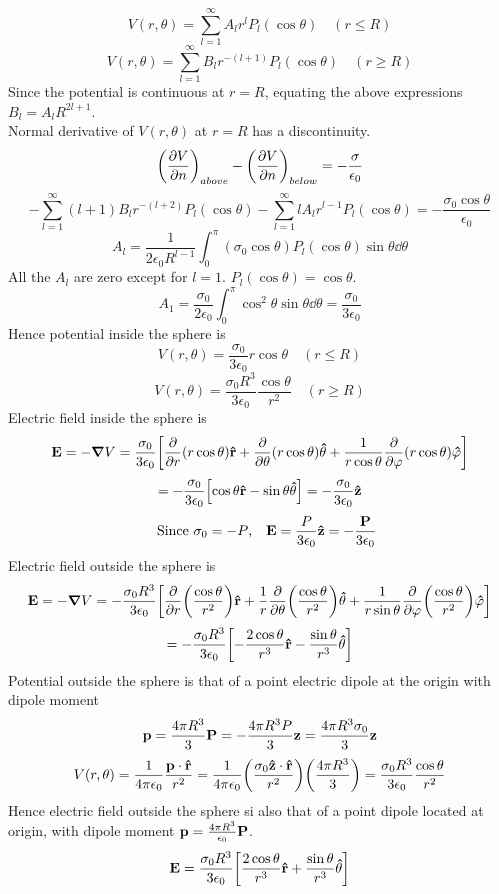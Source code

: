 \documentclass[12pt]{article}
\begin{document}
\[V(r,\theta)=\sum_{l=1}^{\infty}A_lr^lP_l(\cos\theta)\quad(r\leq R)\]
\[V(r,\theta)=\sum_{l=1}^{\infty}B_lr^{-(l+1)}P_l(\cos\theta)\quad(r\geq R)\]
Since the potential is continuous at $r=R$, equating the above expressions $B_l=A_lR^{2l+1}$.\\
Normal derivative of $V(r,\theta)$ at $r=R$ has a discontinuity.
\[\qty(\pdv{V}{n})_{above}-\qty(\pdv{V}{n})_{below}=-\frac{\sigma}{\epsilon_0}\]
\[-\sum_{l=1}^{\infty}(l+1)B_lr^{-(l+2)}P_l(\cos\theta)-\sum_{l=1}^{\infty}lA_lr^{l-1}P_l(\cos\theta)=-\frac{\sigma_0\cos\theta}{\epsilon_0}\]
\[A_l=\frac{1}{2\epsilon_0R^{l-1}}\int_0^{\pi}(\sigma_0\cos\theta)P_l(\cos\theta)\sin\theta\dd\theta\]
All the $A_l$ are zero except for $l=1$. $P_l(\cos\theta)=\cos\theta$.
\[A_1=\frac{\sigma_0}{2\epsilon_0}\int_0^{\pi}\cos^2\theta\sin\theta\dd\theta=\frac{\sigma_0}{3\epsilon_0}\]
Hence potential inside the sphere is \[V(r,\theta)=\frac{\sigma_0}{3\epsilon_0}r\cos\theta\quad(r\leq R)\]
\[V(r,\theta)=\frac{\sigma_0R^3}{3\epsilon_0}\frac{\cos\theta}{r^2}\quad(r\geq R)\]
Electric field inside the sphere is \[\vb{E}=-\grad{V}=\frac{\sigma_0}{3\epsilon_0}\qty[\pdv{r}(r\cos\theta)\vu{r}+\pdv{\theta}(r\cos\theta)\vu{\theta}+\frac{1}{r\cos\theta}\pdv{\varphi}(r\cos\theta)\vu{\varphi}]\]
\[=-\frac{\sigma_0}{3\epsilon_0}\qty[\cos\theta\vu{r}-\sin\theta\vu{\theta}]=-\frac{\sigma_0}{3\epsilon_0}\vu{z}\]
 \[\qq{Since $\sigma_0=-P$,}\vb{E}=\frac{P}{3\epsilon_0}\vu{z}=-\frac{\vb{P}}{3\epsilon_0}\]
 Electric field outside the sphere is \[\vb{E}=-\grad{V}=-\frac{\sigma_0R^3}{3\epsilon_0}\qty[\pdv{r}\qty(\frac{\cos\theta}{r^2})\vu{r}+\frac{1}{r}\pdv{\theta}\qty(\frac{\cos\theta}{r^2})\vu{\theta}+\frac{1}{r\sin\theta}\pdv{\varphi}\qty(\frac{\cos\theta}{r^2})\vu{\varphi}]\]
\[=-\frac{\sigma_0R^3}{3\epsilon_0}\qty[-\frac{2\cos\theta}{r^3}\vu{r}-\frac{\sin\theta}{r^3}\vu{\theta}]\]
Potential outside the sphere is that of a point electric dipole at the origin with dipole moment \[\vb{p}=\frac{4\pi R^3}{3}\vb{P}=-\frac{4\pi R^3P}{3}\vb{z}=\frac{4\pi R^3\sigma_0}{3}\vb{z}\]
\[V(r,\theta)=\frac{1}{4\pi\epsilon_0}\frac{\vb{p}\cdot\vu{r}}{r^2}=\frac{1}{4\pi\epsilon_0}\qty(\frac{\sigma_0\vu{z}\cdot\vu{r}}{r^2})\qty(\frac{4\pi R^3}{3})=\frac{\sigma_0R^3}{3\epsilon_0}\frac{\cos\theta}{r^2}\]
Hence electric field outside the sphere si also that of a point dipole located at origin, with dipole moment $\vb{p}=\frac{4\pi R^3}{\epsilon_0}\vb{P}$.
\[\vb{E}=\frac{\sigma_0 R^3}{3\epsilon_0}\qty[\frac{2\cos\theta}{r^3}\vu{r}+\frac{\sin\theta}{r^3}\vu{\theta}]\]
\end{document}

